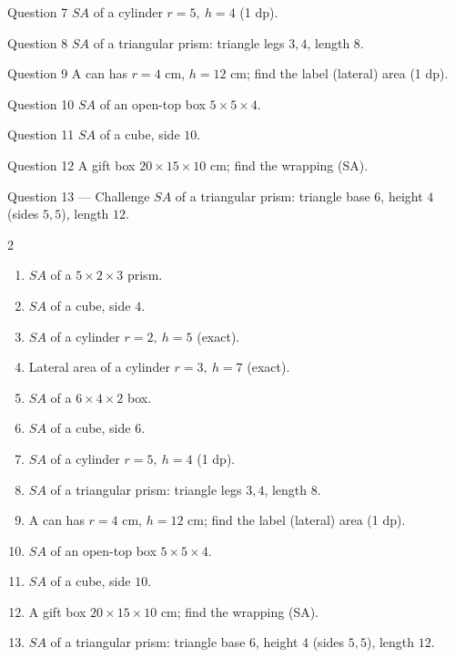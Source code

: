 \documentclass[11pt]{article}
\begin{document}
\begin{qbox}{Question 7}
$SA$ of a cylinder $r=5,\ h=4$ (1 dp).\workspace{2.2cm}
\end{qbox}

\begin{qbox}{Question 8}
$SA$ of a triangular prism: triangle legs $3,4$, length $8$.\workspace{2.4cm}
\end{qbox}

\begin{qbox}{Question 9}
A can has $r=4$ cm, $h=12$ cm; find the label (lateral) area (1 dp).\workspace{2.2cm}
\end{qbox}

\begin{qbox}{Question 10}
$SA$ of an open-top box $5\times5\times4$.\workspace{2.2cm}
\end{qbox}

\begin{qbox}{Question 11}
$SA$ of a cube, side $10$.\workspace{1.8cm}
\end{qbox}

\begin{qbox}{Question 12}
A gift box $20\times15\times10$ cm; find the wrapping (SA).\workspace{2.4cm}
\end{qbox}

\begin{qbox}{Question 13 --- Challenge}
$SA$ of a triangular prism: triangle base $6$, height $4$ (sides $5,5$), length $12$.\workspace{2.6cm}
\end{qbox}

\clearpage
{}

\begin{recapbox}
\begin{multicols}{2}
\small
\begin{enumerate}[leftmargin=*,itemsep=3pt]
  \item $SA$ of a $5\times2\times3$ prism.
  \item $SA$ of a cube, side $4$.
  \item $SA$ of a cylinder $r=2,\ h=5$ (exact).
  \item Lateral area of a cylinder $r=3,\ h=7$ (exact).
  \item $SA$ of a $6\times4\times2$ box.
  \item $SA$ of a cube, side $6$.
  \item $SA$ of a cylinder $r=5,\ h=4$ (1 dp).
  \item $SA$ of a triangular prism: triangle legs $3,4$, length $8$.
  \item A can has $r=4$ cm, $h=12$ cm; find the label (lateral) area (1 dp).
  \item $SA$ of an open-top box $5\times5\times4$.
  \item $SA$ of a cube, side $10$.
  \item A gift box $20\times15\times10$ cm; find the wrapping (SA).
  \item $SA$ of a triangular prism: triangle base $6$, height $4$ (sides $5,5$), length $12$.
\end{enumerate}
\end{multicols}
\end{recapbox}
\end{document}
